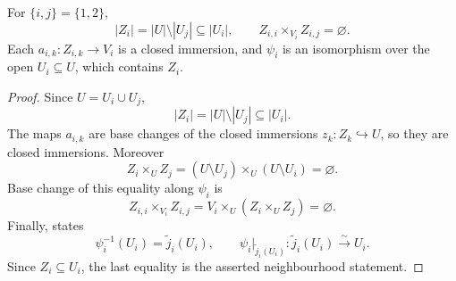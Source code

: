 \begin{lemma}
  \label{lemma:nagata-boundary-loci}
  \lean{}

  For $\{i,j\}=\{1,2\}$,
  \[
    |Z_i|=|U|\setminus|U_j|\subseteq|U_i|,
    \qquad
    Z_{i,i}\times_{V_i}Z_{i,j}=\varnothing.
  \]
  Each $a_{i,k}\colon Z_{i,k}\to V_i$ is a closed immersion, and
  $\psi_i$ is an isomorphism over the open $U_i\subseteq U$, which contains
  $Z_i$.
\end{lemma}

\begin{proof}
  Since $U=U_i\cup U_j$,
  \[
    |Z_i|=|U|\setminus|U_j|
      \subseteq |U_i|.
  \]
  The maps $a_{i,k}$ are base changes of the closed immersions
  $z_k\colon Z_k\hookrightarrow U$, so they are closed immersions.  Moreover
  \[
    Z_i\times_UZ_j
      =(U\setminus U_j)\times_U(U\setminus U_i)
      =\varnothing.
  \]
  Base change of this equality along $\psi_i$ is
  \[
    Z_{i,i}\times_{V_i}Z_{i,j}
      =V_i\times_U(Z_i\times_UZ_j)=\varnothing.
  \]
  Finally,  states
  \[
    \psi_i^{-1}(U_i)=\widetilde j_i(U_i),\qquad
    \psi_i|_{\widetilde j_i(U_i)}\colon
      \widetilde j_i(U_i)\xrightarrow{\sim}U_i.
  \]
  Since $Z_i\subseteq U_i$, the last equality is the asserted
  neighbourhood statement.
\end{proof}

